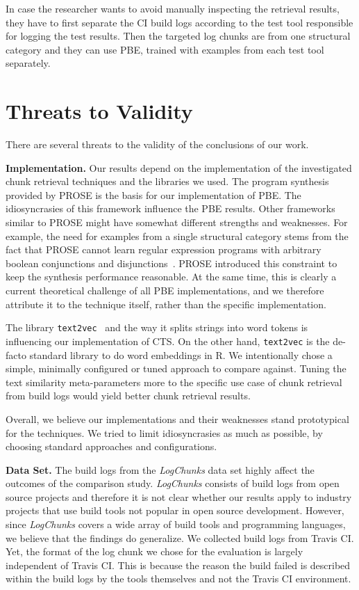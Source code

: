 In case the researcher wants to avoid manually inspecting the
retrieval results, they have to first separate the CI build logs
according to the test tool responsible for logging the test results.
Then the targeted log chunks are from one structural category and they
can use PBE, trained with examples from each test tool separately.

\section{Threats to Validity}
There are several threats to the validity of the conclusions of our
work.

\textbf{Implementation.}
Our results depend on the implementation of the investigated chunk
retrieval techniques and the libraries we used.
The program synthesis provided by PROSE is the basis for our
implementation of PBE\@.
The
idiosyncrasies of this framework influence the PBE results.
Other
frameworks similar to PROSE might have somewhat different strengths
and weaknesses.
For example, the need for examples from a single
structural category stems from the fact that PROSE cannot learn
regular expression programs with arbitrary boolean conjunctions and
disjunctions~\cite{mayer2015user}.
PROSE introduced this constraint to
keep the synthesis performance reasonable.
At the same time, this is
clearly a current theoretical challenge of all PBE implementations,
and we therefore attribute it to the technique itself, rather than the
specific implementation.

The library
{\tt text2vec}~\cite{text2vec2019webpage}
and the way it splits strings into word tokens is influencing
our implementation of CTS\@.
On the other hand,
{\tt text2vec} is the de-facto standard library to do word embeddings
in R.
We intentionally chose a simple, minimally configured or tuned
approach to compare against.
Tuning the text similarity
meta-parameters more to the specific use case of chunk retrieval from
build logs would yield better chunk retrieval results.

Overall, we believe our implementations and their weaknesses stand
prototypical for the techniques.
We tried to limit idiosyncrasies as much as possible, by choosing
standard approaches and configurations.

\textbf{Data Set.}
The build logs from the \emph{LogChunks} data set highly affect
the outcomes of the comparison study.
\emph{LogChunks} consists of build
logs from open source projects and therefore it is not clear whether
our results apply to industry projects that use build tools
not popular in open source development.
However, since \emph{LogChunks} covers a wide array of build tools and
programming languages,
we believe that the findings do generalize.
We collected build logs from Travis CI.
Yet, the format of the log chunk we chose
for the evaluation is largely independent of Travis CI\@.
This
is because the reason the build failed is described within the build
logs by the tools themselves and not the Travis CI environment.

